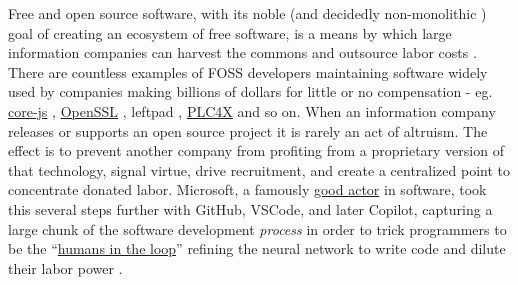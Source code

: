 \documentclass{article}
\begin{document}
Free and open source software, with its noble (and decidedly
non-monolithic \cite{liuFreedomIsnFree2018} ) goal of creating an
ecosystem of free software, is
a means by which large information companies can harvest the commons and
outsource labor costs \cite{warkHackerManifesto2004, goldsmithOriginalSinFree2019, hallidayOpenSourceNot2018, hunterReclaimingComputingCommons2016, hornPostOpenSource2020} . There
are countless examples of FOSS developers maintaining software widely
used by companies making billions of dollars for little or no
compensation - eg.
\href{https://github.com/zloirock/core-js/blob/master/docs/2023-02-14-so-whats-next.md}{core-js}
\cite{pushkarevWhatNext2023} ,
\href{https://veridicalsystems.com/blog/of-money-responsibility-and-pride/index.html}{OpenSSL}
\cite{marquessSpeedsFeedsMoney2014} , leftpad \cite{gallagherRagequitCoderUnpublished2016} ,
\href{https://github.com/chrisdutz/blog/blob/main/plc4x/free-trial-expired.adoc}{PLC4X}
\cite{dutzYourFreeTrial2022}  and so on. When an information
company releases or supports an open source project it is rarely an act
of altruism. The effect is to prevent another company from profiting
from a proprietary version of that technology, signal virtue, drive
recruitment, and create a centralized point to concentrate donated
labor. Microsoft, a famously
\href{https://en.wikipedia.org/wiki/Embrace,_extend,_and_extinguish}{good
actor} in software, took this several steps further with GitHub, VSCode,
and later Copilot, capturing a large chunk of the software development
\emph{process} in order to trick programmers to be the
``\href{https://twitter.com/json_dirs/status/1410897161277956097}{humans
in the loop}'' refining the neural network to write code and dilute
their labor power \cite{butterickGitHubCopilotInvestigation2022, butterickGitHubCopilotLitigation2022, olearyVSCodeWhat2022, VSCodiumOpenSource} .
\end{document}
